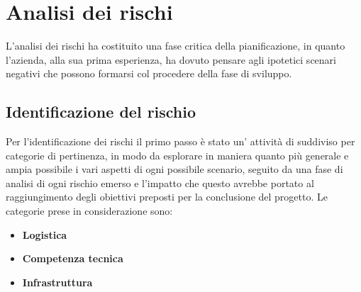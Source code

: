 \documentclass{scalatekids-article}
\begin{document}
\section{Analisi dei rischi}
L'analisi dei rischi ha costituito una fase critica della pianificazione, in
quanto l'azienda, alla sua prima esperienza, ha dovuto pensare agli ipotetici
scenari negativi che possono formarsi col procedere della fase di sviluppo.
\subsection{Identificazione del rischio}
Per l'identificazione dei rischi il primo passo è stato un' attività di
 suddiviso per categorie di pertinenza, in modo da esplorare
in maniera quanto più generale e ampia possibile i vari aspetti di ogni
possibile scenario, seguito da una fase di analisi di ogni rischio emerso e
l'impatto che questo avrebbe portato al raggiungimento degli obiettivi preposti
per la conclusione del progetto. Le categorie prese in considerazione sono:
\begin{itemize}
\item\textbf{Logistica}
\item\textbf{Competenza tecnica}
\item\textbf{Infrastruttura}
\end{itemize}
\end{document}
